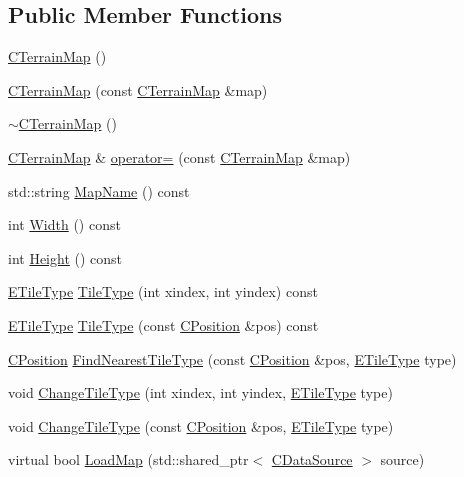 \subsection*{Public Member Functions}
\begin{DoxyCompactItemize}
\item 
\hyperlink{classCTerrainMap_a2ac9c0f2622d06b8e0b1f5d67199f1ea}{C\+Terrain\+Map} ()
\item 
\hyperlink{classCTerrainMap_a9c98a824cf26ee35735a632472ca7ffd}{C\+Terrain\+Map} (const \hyperlink{classCTerrainMap}{C\+Terrain\+Map} \&map)
\item 
\hyperlink{classCTerrainMap_a7e7b02ec0a42ca686fc895d0923567b3}{$\sim$\+C\+Terrain\+Map} ()
\item 
\hyperlink{classCTerrainMap}{C\+Terrain\+Map} \& \hyperlink{classCTerrainMap_ad9f476d5d4db6de2907dfa3d4d9de7e6}{operator=} (const \hyperlink{classCTerrainMap}{C\+Terrain\+Map} \&map)
\item 
std\+::string \hyperlink{classCTerrainMap_a2bdc91c2f8d16783992363ea16532dd7}{Map\+Name} () const
\item 
int \hyperlink{classCTerrainMap_a34cb754aa9b26e85a73377159f2527d7}{Width} () const
\item 
int \hyperlink{classCTerrainMap_ae5e4bf6507e0e3e9ac0322b43eed8a7a}{Height} () const
\item 
\hyperlink{classCTerrainMap_aff2ab991e237269941416dd79d8871d4}{E\+Tile\+Type} \hyperlink{classCTerrainMap_a7e0e440467a09cb1c59e2bdbec01ccb4}{Tile\+Type} (int xindex, int yindex) const
\item 
\hyperlink{classCTerrainMap_aff2ab991e237269941416dd79d8871d4}{E\+Tile\+Type} \hyperlink{classCTerrainMap_a3a7229412b3391835dd6036439e5c6c0}{Tile\+Type} (const \hyperlink{classCPosition}{C\+Position} \&pos) const
\item 
\hyperlink{classCPosition}{C\+Position} \hyperlink{classCTerrainMap_af32811cace3a3b01c9519b304ddb8efc}{Find\+Nearest\+Tile\+Type} (const \hyperlink{classCPosition}{C\+Position} \&pos, \hyperlink{classCTerrainMap_aff2ab991e237269941416dd79d8871d4}{E\+Tile\+Type} type)
\item 
void \hyperlink{classCTerrainMap_a40757d66d7458620a327d6f69a35a2bd}{Change\+Tile\+Type} (int xindex, int yindex, \hyperlink{classCTerrainMap_aff2ab991e237269941416dd79d8871d4}{E\+Tile\+Type} type)
\item 
void \hyperlink{classCTerrainMap_a4a4f26c13a3d8116f4295bef3c25c3e5}{Change\+Tile\+Type} (const \hyperlink{classCPosition}{C\+Position} \&pos, \hyperlink{classCTerrainMap_aff2ab991e237269941416dd79d8871d4}{E\+Tile\+Type} type)
\item 
virtual bool \hyperlink{classCTerrainMap_a620258ecf38afb6275c865dad4fc4af4}{Load\+Map} (std\+::shared\+\_\+ptr$<$ \hyperlink{classCDataSource}{C\+Data\+Source} $>$ source)
\end{DoxyCompactItemize}
